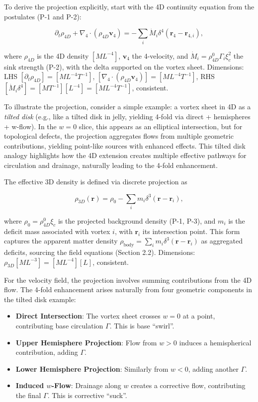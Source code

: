 To derive the projection explicitly, start with the 4D continuity equation from the postulates (P-1 and P-2):

\begin{equation}
\partial_t \rho_{4D} + \nabla_4 \cdot (\rho_{4D} \mathbf{v}_4) = -\sum_i \dot{M}_i \delta^4(\mathbf{r}_4 - \mathbf{r}_{4,i}),
\end{equation}

where $\rho_{4D}$ is the 4D density $[M L^{-4}]$, $\mathbf{v}_4$ the 4-velocity, and $\dot{M}_i = \rho_{4D}^0 \Gamma_i \xi_c^2$ the sink strength (P-2), with the delta supported on the vortex sheet. Dimensions: LHS $[\partial_t \rho_{4D}] = [M L^{-4} T^{-1}]$, $[\nabla_4 \cdot (\rho_{4D} \mathbf{v}_4)] = [M L^{-4} T^{-1}]$, RHS $[\dot{M}_i \delta^4] = [M T^{-1}] [L^{-4}] = [M L^{-4} T^{-1}]$, consistent.

To illustrate the projection, consider a simple example: a vortex sheet in 4D as a \emph{tilted disk} (e.g., like a tilted disk in jelly, yielding 4-fold via direct + hemispheres + w-flow). In the $w=0$ slice, this appears as an elliptical intersection, but for topological defects, the projection aggregates flows from multiple geometric contributions, yielding point-like sources with enhanced effects. This tilted disk analogy highlights how the 4D extension creates multiple effective pathways for circulation and drainage, naturally leading to the 4-fold enhancement.

The effective 3D density is defined via discrete projection as

\begin{equation}
\rho_{3D}(\mathbf{r}) = \rho_0 - \sum_i m_i \delta^3(\mathbf{r} - \mathbf{r}_i),
\end{equation}

where $\rho_0 = \rho_{4D}^0 \xi_c$ is the projected background density (P-1, P-3), and $m_i$ is the deficit mass associated with vortex $i$, with $\mathbf{r}_i$ its intersection point. This form captures the apparent matter density $\rho_{\text{body}} = \sum_i m_i \delta^3(\mathbf{r} - \mathbf{r}_i)$ as aggregated deficits, sourcing the field equations (Section 2.2). Dimensions: $\rho_{3D} [M L^{-3}] = [M L^{-4}] [L]$, consistent.

For the velocity field, the projection involves summing contributions from the 4D flow. The 4-fold enhancement arises naturally from four geometric components in the tilted disk example:

\begin{itemize}
\item \textbf{Direct Intersection}: The vortex sheet crosses $w=0$ at a point, contributing base circulation $\Gamma$. This is base ``swirl''.
\item \textbf{Upper Hemisphere Projection}: Flow from $w>0$ induces a hemispherical contribution, adding $\Gamma$.
\item \textbf{Lower Hemisphere Projection}: Similarly from $w<0$, adding another $\Gamma$.
\item \textbf{Induced $w$-Flow}: Drainage along $w$ creates a corrective flow, contributing the final $\Gamma$. This is corrective ``suck''.
\end{itemize}

